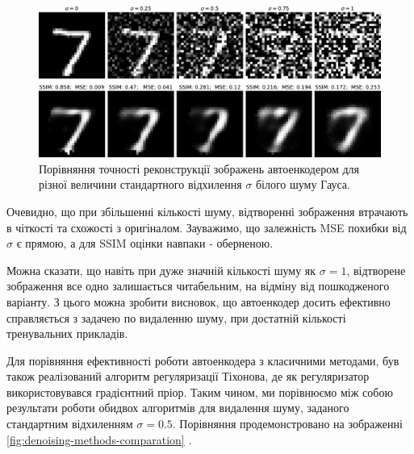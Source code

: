\documentclass[14pt,a4paper]{extarticle}
\newcounter{e}
\numberwithin{equation}{section}
\numberwithin{figure}{section}
\begin{document}
	\begin{figure}[H]
		\centering
		\includegraphics[width=1\textwidth]{../resources/denoising-awgn-comparation.pdf}
		\caption{Порівняння точності реконструкції зображень автоенкодером для різної величини стандартного відхилення $\sigma$ білого шуму Гауса.}
		\label{fig:denoising-awgn-comparation}
	\end{figure}
	
	Очевидно, що при збільшенні кількості шуму, відтворенні зображення втрачають в чіткості та схожості з оригіналом. Зауважимо, що залежність MSE похибки від $\sigma$ є прямою, а для SSIM оцінки навпаки - оберненою. 
	
	Можна сказати, що навіть при дуже значній кількості шуму як $\sigma=1$, відтворене зображення все одно залишається читабельним, на відміну від пошкодженого варіанту. З цього можна зробити висновок, що автоенкодер досить ефективно справляється з задачею по видаленню шуму, при достатній кількості тренувальних прикладів.
	
	Для порівняння ефективності роботи автоенкодера з класичними методами, був також реалізований алгоритм регуляризації Тіхонова, де як регуляризатор використовувався градієнтний пріор. Таким чином, ми порівнюємо між собою результати роботи обидвох алгоритмів для видалення шуму, заданого стандартним відхиленням $\sigma=0.5$. Порівняння продемонстровано на зображенні \ref{fig:denoising-methods-comparation} . 
\end{document}
